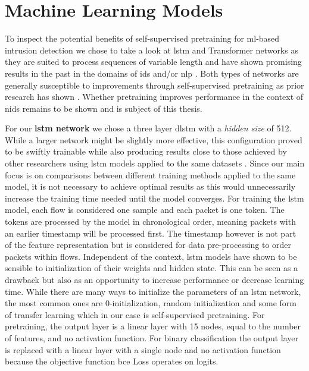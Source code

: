\section{Machine Learning Models}

To inspect the potential benefits of self-supervised pretraining for \gls{ml}-based intrusion detection we chose to take a look at \gls{lstm} and Transformer networks as they are suited to process sequences of variable length and have shown promising results in the past in the domains of \gls{ids} and/or \gls{nlp} . Both types of networks are generally susceptible to improvements through self-supervised pretraining as prior research has shown \cite{bert} \cite{unsupervised_learning_lstms} \cite{unsupervised_learning_lstms_timeseries}. Whether pretraining improves performance in the context of \gls{nids} remains to be shown and is subject of this thesis.

For our \textbf{\gls{lstm} network} we chose a three layer \gls{dlstm} with a \textit{hidden size} of 512. While a larger network might be slightly more effective, this configuration proved to be swiftly trainable while also producing results close to those achieved by other researchers using \gls{lstm} models applied to the same datasets \cite{fog_based_detection_survey_2020}. Since our main focus is on comparisons between different training methods applied to the same model, it is not necessary to achieve optimal results as this would unnecessarily increase the training time needed until the model converges. For training the \gls{lstm} model, each flow is considered one sample and each packet is one token. The tokens are processed by the model in chronological order, meaning packets with an earlier timestamp will be processed first. The timestamp however is not part of the feature representation but is considered for data pre-processing to order packets within flows. Independent of the context, \gls{lstm} models have shown to be sensible to initialization of their weights and hidden state. This can be seen as a drawback but also as an opportunity to increase performance or decrease learning time. While there are many ways to initialize the parameters of an \gls{lstm} network, the most common ones are 0-initialization, random initialization and some form of transfer learning which in our case is self-supervised pretraining. For pretraining, the output layer is a linear layer with 15 nodes, equal to the number of features, and no activation function. For binary classification the output layer is replaced with a linear layer with a single node and no activation function because the objective function \gls{bce} Loss operates on logits.

